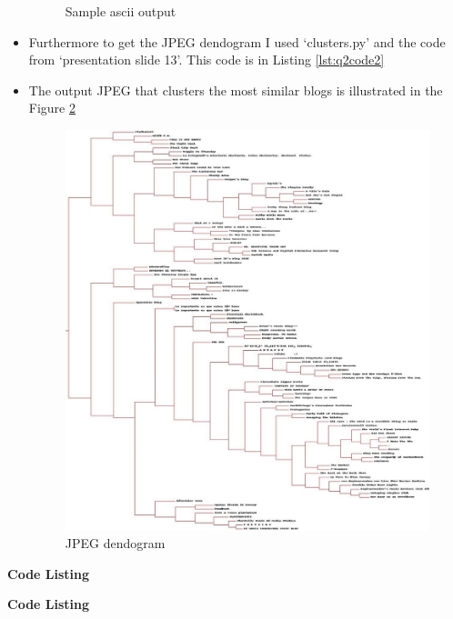 \begin{itemize}
\begin{figure}[h!]
\begin{center}
\caption{Sample ascii output}
\label{fig:q2fig1}
\end{center}
\end{figure}
\item Furthermore to get the JPEG dendogram I used `clusters.py' and the code from `presentation slide 13'. This code is in Listing \ref{lst:q2code2} 
\newpage
\item The output JPEG that clusters the most similar blogs is illustrated in the Figure \ref{fig:q2fig2}
\begin{figure}[h!]
\begin{center}
\includegraphics[scale=0.55, keepaspectratio=true]{figures/blogclust.jpg}
\caption{JPEG dendogram}
\label{fig:q2fig2}
\end{center}
\end{figure}
\end{itemize}


\newpage
\textbf{Code Listing}
\sloppy



\textbf{Code Listing}
\sloppy
